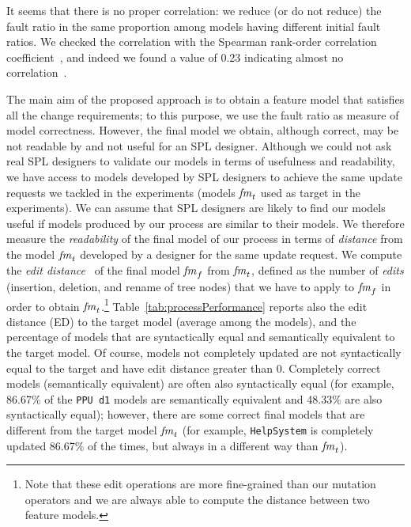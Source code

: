 \begin{tikzborder}{\cite{Gargantini16:validation}}
\begin{tikzborder}{\cite{gargantini_combinatorial_2017}}
\begin{tikzborder}{\cite{garn2019}}
\begin{tikzborder}{\cite{arcaini2019achieving}}
	\bb It seems that there is no proper correlation: we reduce (or do not reduce) the fault ratio in the same proportion among models having different initial fault ratios. We checked the correlation with the Spearman rank-order correlation coefficient~\cite{Wohlin2012}, and indeed we found a value of 0.23 indicating almost no correlation~\cite{hinkle2003applied}.
	
	
	The main aim of the proposed approach is to obtain a feature model that satisfies all the change requirements; to this purpose, we use the fault ratio as measure of model correctness. However, the final model we obtain, although correct, may be not readable by and not useful for an SPL designer. Although we could not ask real SPL designers to validate our models in terms of usefulness and readability, we have access to models developed by SPL designers to achieve the same update requests we tackled in the experiments (models $\mathit{fm}_t$ used as target in the experiments). We can assume that SPL designers are likely to find our models useful if models produced by our process are similar to their models. We therefore measure the {\it readability} of the final model of our process in terms of {\it distance} from the model $\mathit{fm}_t$ developed by a designer for the same update request. We compute the {\it edit distance}~\cite{pawlik_efficient_2015,pawlik_tree_2016} of the final model $\mathit{fm}_f$ from $\mathit{fm}_t$, defined as the number of {\it edits} (insertion, deletion, and rename of tree nodes) that we have to apply to $\mathit{fm}_f$ in order to obtain $\mathit{fm}_t$.\footnote{Note that these edit operations are more fine-grained than our mutation operators and we are always able to compute the distance between two feature models.} Table~\ref{tab:processPerformance} reports also the edit distance (ED) to the target model (average among the models), and the percentage of models that are syntactically equal and semantically equivalent to the target model. Of course, models not completely updated are not syntactically equal to the target and have edit distance greater than 0. Completely correct models (semantically equivalent) are often also syntactically equal (for example, 86.67\% of the {\tt PPU d1} models are semantically equivalent and 48.33\% are also syntactically equal); however, there are some correct final models that are different from the target model $\mathit{fm}_t$ (for example, {\tt HelpSystem} is completely updated 86.67\% of the times, but always in a different way than $\mathit{fm}_t$).
	

\end{tikzborder}
\end{tikzborder}
\end{tikzborder}
\end{tikzborder}
